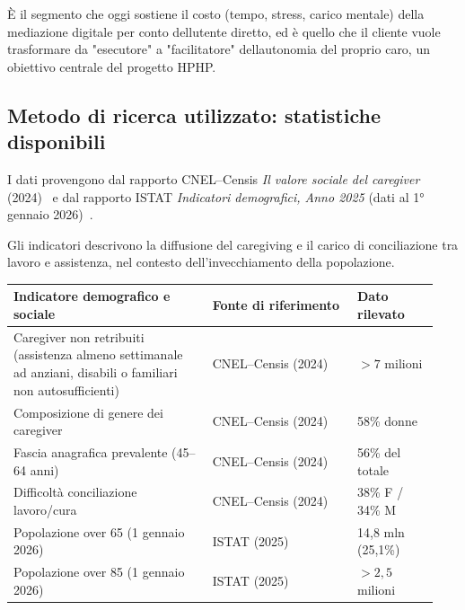 È il segmento che oggi sostiene il costo (tempo, stress, carico mentale)
della mediazione digitale per conto dell\textquotesingle utente diretto,
ed è quello che il cliente vuole trasformare da "esecutore" a
"facilitatore" dell\textquotesingle autonomia del proprio
caro, un obiettivo centrale del progetto HPHP.

\subsection[Statistiche disponibili]{Metodo di ricerca utilizzato: statistiche disponibili}

I dati provengono dal rapporto CNEL--Censis \emph{Il valore sociale del caregiver}
(2024)~\cite{cnelCaregiver2024} e dal rapporto ISTAT \emph{Indicatori demografici, Anno 2025}
(dati al 1° gennaio 2026)~\cite[pp.~1, 9]{istatDemografia2025}.

Gli indicatori descrivono la diffusione del caregiving e il carico di
conciliazione tra lavoro e assistenza, nel contesto dell'invecchiamento della
popolazione.

\begin{center}
\begin{minipage}{\linewidth}
\centering
{}\label{tab:a-2}
\small
\noindent\begin{tabular}{@{}p{0.44\linewidth}p{0.32\linewidth}p{0.18\linewidth}@{}}
\toprule
\textbf{Indicatore demografico e sociale} & \textbf{Fonte di riferimento} & \textbf{Dato rilevato} \\
\midrule
Caregiver non retribuiti (assistenza almeno settimanale ad anziani, disabili o familiari non autosufficienti) & CNEL--Censis (2024) & $> 7$ milioni \\
Composizione di genere dei caregiver & CNEL--Censis (2024) & 58\% donne \\
Fascia anagrafica prevalente (45--64 anni) & CNEL--Censis (2024) & 56\% del totale \\
Difficoltà conciliazione lavoro/cura & CNEL--Censis (2024) & 38\% F / 34\% M \\
Popolazione over 65 (1 gennaio 2026) & ISTAT (2025) & 14,8 mln (25,1\%) \\
Popolazione over 85 (1 gennaio 2026) & ISTAT (2025) & $> 2,5$ milioni \\
\bottomrule
\end{tabular}
\end{minipage}
\end{center}


